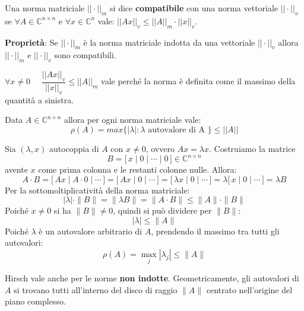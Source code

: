 \documentclass[12pt,a4paper,]{report}
\begin{document}
\begin{definizione}
    Una norma matriciale $||\cdot||_m$ si dice \textbf{compatibile} con una norma vettoriale $||\cdot||_v$ se $\forall A \in \mathbb{C}^{n\times n}$ e $\forall x \in \mathbb{C}^n$ vale: $||Ax||_v \leq ||A||_m \cdot ||x||_v$.
\end{definizione}
\noindent
\textbf{Proprietà}:
Se $||\cdot||_m$ è la norma matriciale indotta da una vettoriale $||\cdot||_v$ allora $||\cdot||_m$ e $||\cdot||_v$ sono compatibili.
\begin{dimostrazionelibera}
    $\forall x \neq 0$ $\quad \dfrac{||Ax||_v}{||x||_v} \leq ||A||_m$
     vale perché la norma è definita come il massimo della quantità a sinistra.
\end{dimostrazionelibera}

\begin{teorema}
    \label{th: Hirsh}
    Data $A\in \mathbb{C}^{n\times n}$ allora per ogni norma matriciale vale:
    \[
    \rho(A) = max\{|\lambda|:\lambda \text{ autovalore di A }\} \leq ||A||
    \]
\end{teorema}

\begin{dimostrazione}
    Sia $(\lambda, x)$ autocoppia di $A$ con $x \neq 0$, ovvero $Ax = \lambda x$.
    Costruiamo la matrice
    \[
        B = \bigl[\, x \mid 0 \mid \cdots \mid 0 \,\bigr] \in \mathbb{C}^{n \times n}
    \]
    avente $x$ come prima colonna e le restanti colonne nulle. Allora:
    \[
        A \cdot B
        = \bigl[\, Ax \mid A \cdot 0 \mid \cdots \,\bigr]
        = \bigl[\, Ax \mid 0 \mid \cdots \,\bigr]
        = \bigl[\, \lambda x \mid 0 \mid \cdots \,\bigr]
        = \lambda \bigl[\, x \mid 0 \mid \cdots \,\bigr]
        = \lambda B
    \]
    Per la sottomoltiplicatività della norma matriciale:
    \[
        |\lambda| \cdot \|B\| = \|\lambda B\| = \|A \cdot B\| \leq \|A\| \cdot \|B\|
    \]
    Poiché $x \neq 0$ si ha $\|B\| \neq 0$, quindi si può dividere per $\|B\|$:
    \[
        |\lambda| \leq \|A\|
    \]
    Poiché $\lambda$ è un autovalore arbitrario di $A$, prendendo il massimo tra tutti gli autovalori:
    \[
        \rho(A) = \max_j |\lambda_j| \leq \|A\|
    \]
\end{dimostrazione}
\begin{nota}
    Hirsch vale anche per le norme \textbf{non indotte}. Geometricamente, gli autovalori di $A$
    si trovano tutti all'interno del disco di raggio $\|A\|$ centrato nell'origine del piano complesso.
\end{nota}
\end{document}

